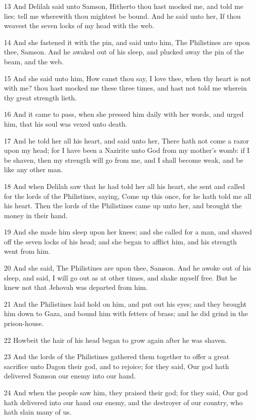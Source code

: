 \par 13 And Delilah said unto Samson, Hitherto thou hast mocked me, and told me lies: tell me wherewith thou mightest be bound. And he said unto her, If thou weavest the seven locks of my head with the web.
\par 14 And she fastened it with the pin, and said unto him, The Philistines are upon thee, Samson. And he awaked out of his sleep, and plucked away the pin of the beam, and the web.
\par 15 And she said unto him, How canst thou say, I love thee, when thy heart is not with me? thou hast mocked me these three times, and hast not told me wherein thy great strength lieth.
\par 16 And it came to pass, when she pressed him daily with her words, and urged him, that his soul was vexed unto death.
\par 17 And he told her all his heart, and said unto her, There hath not come a razor upon my head; for I have been a Nazirite unto God from my mother's womb: if I be shaven, then my strength will go from me, and I shall become weak, and be like any other man.
\par 18 And when Delilah saw that he had told her all his heart, she sent and called for the lords of the Philistines, saying, Come up this once, for he hath told me all his heart. Then the lords of the Philistines came up unto her, and brought the money in their hand.
\par 19 And she made him sleep upon her knees; and she called for a man, and shaved off the seven locks of his head; and she began to afflict him, and his strength went from him.
\par 20 And she said, The Philistines are upon thee, Samson. And he awoke out of his sleep, and said, I will go out as at other times, and shake myself free. But he knew not that Jehovah was departed from him.
\par 21 And the Philistines laid hold on him, and put out his eyes; and they brought him down to Gaza, and bound him with fetters of brass; and he did grind in the prison-house.
\par 22 Howbeit the hair of his head began to grow again after he was shaven.
\par 23 And the lords of the Philistines gathered them together to offer a great sacrifice unto Dagon their god, and to rejoice; for they said, Our god hath delivered Samson our enemy into our hand.
\par 24 And when the people saw him, they praised their god; for they said, Our god hath delivered into our hand our enemy, and the destroyer of our country, who hath slain many of us.
